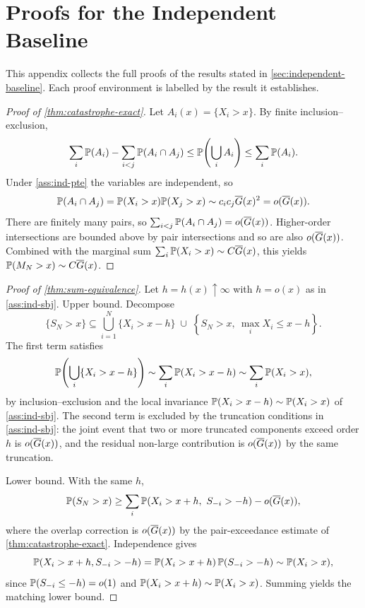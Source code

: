 \section{Proofs for the Independent Baseline}
\label{appx:independent-proofs}

This appendix collects the full proofs of the results stated in
\cref{sec:independent-baseline}. Each proof environment is labelled by the
result it establishes.

\begin{proof}[Proof of \cref{thm:catastrophe-exact}]
Let \(A_i(x)=\{X_i>x\}\). By finite inclusion--exclusion,
\[
  \sum_i\mathbb{P}(A_i)-\sum_{i<j}\mathbb{P}(A_i\cap A_j)
  \le \mathbb{P}\!\left(\bigcup_iA_i\right)
  \le \sum_i\mathbb{P}(A_i).
\]
Under \cref{ass:ind-pte} the variables are independent, so
\[
  \mathbb{P}(A_i\cap A_j)=\mathbb{P}(X_i>x)\mathbb{P}(X_j>x)
  \sim c_ic_j\overline{G}(x)^2=o(\overline{G}(x)).
\]
There are finitely many pairs, so \(\sum_{i<j}\mathbb{P}(A_i\cap A_j)=o(\overline{G}(x))\).
Higher-order intersections are bounded above by pair intersections and so are
also \(o(\overline{G}(x))\). Combined with the marginal sum
\(\sum_i\mathbb{P}(X_i>x)\sim C\overline{G}(x)\), this yields
\(\mathbb{P}(M_N>x)\sim C\overline{G}(x)\).
\end{proof}

\begin{proof}[Proof of \cref{thm:sum-equivalence}]
Let \(h=h(x)\uparrow\infty\) with \(h=o(x)\) as in \cref{ass:ind-sbj}.
Upper bound. Decompose
\[
  \{S_N>x\}\subseteq
  \bigcup_{i=1}^N\{X_i>x-h\}
  \;\cup\;
  \left\{S_N>x,\ \max_i X_i\le x-h\right\}.
\]
The first term satisfies
\[
  \mathbb{P}\!\left(\bigcup_i\{X_i>x-h\}\right)
  \sim \sum_i\mathbb{P}(X_i>x-h)
  \sim \sum_i\mathbb{P}(X_i>x),
\]
by inclusion--exclusion and the local invariance
\(\mathbb{P}(X_i>x-h)\sim\mathbb{P}(X_i>x)\) of \cref{ass:ind-sbj}.
The second term is excluded by the truncation conditions in
\cref{ass:ind-sbj}: the joint event that two or more truncated components
exceed order \(h\) is \(o(\overline{G}(x))\), and the residual non-large contribution is
\(o(\overline{G}(x))\) by the same truncation.

Lower bound. With the same \(h\),
\[
  \mathbb{P}(S_N>x)
  \ge \sum_i\mathbb{P}(X_i>x+h,\ S_{-i}>-h) - o(\overline{G}(x)),
\]
where the overlap correction is \(o(\overline{G}(x))\) by the pair-exceedance estimate
of \cref{thm:catastrophe-exact}. Independence gives
\[
  \mathbb{P}(X_i>x+h,S_{-i}>-h)
  =\mathbb{P}(X_i>x+h)\,\mathbb{P}(S_{-i}>-h)
  \sim \mathbb{P}(X_i>x),
\]
since \(\mathbb{P}(S_{-i}\le -h)=o(1)\) and \(\mathbb{P}(X_i>x+h)\sim\mathbb{P}(X_i>x)\). Summing
yields the matching lower bound.
\end{proof}

